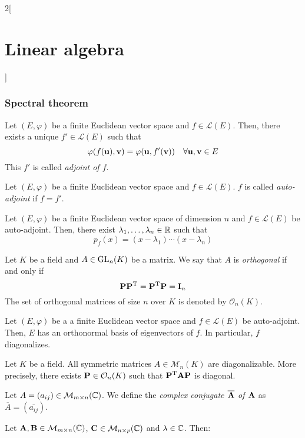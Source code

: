 \documentclass[../../../main.tex]{subfiles}
\begin{document}
\begin{multicols}{2}[\section{Linear algebra}]
\subsubsection*{Spectral theorem}
\begin{definition}
    Let $(E,\varphi)$ be a finite Euclidean vector space and $f\in\mathcal{L}(E)$. Then, there exists a unique $f'\in\mathcal{L}(E)$ such that $$\varphi(f(\vb{u}),\vb{v})=\varphi(\vb{u},f'(\vb{v}))\quad\forall \vb{u},\vb{v}\in E$$ This $f'$ is called \textit{adjoint of $f$}. 
\end{definition}
\begin{definition}
    Let $(E,\varphi)$ be a finite Euclidean vector space and $f\in\mathcal{L}(E)$. $f$ is called \textit{auto-adjoint} if $f=f'$.
\end{definition}
\begin{lemma}
    Let $(E,\varphi)$ be a finite Euclidean vector space of dimension $n$ and $f\in\mathcal{L}(E)$ be auto-adjoint. Then, there exist $\lambda_1,\ldots,\lambda_n\in\mathbb{R}$ such that $$p_f(x)=(x-\lambda_1 )\cdots(x-\lambda_n)$$
\end{lemma}
\begin{definition}
    Let $K$ be a field and $A\in\mathrm{GL}_n(K)$ be a matrix. We say that $A$ is \textit{orthogonal} if and only if $$\vb{P}\vb{P}^{\mathrm{T}}=\vb{P}^{\mathrm{T}}\vb{P}=\vb{I}_n$$ The set of orthogonal matrices of size $n$ over $K$ is denoted by $\mathcal{O}_n(K)$.
\end{definition}
\begin{theorem}
    Let $(E,\varphi)$ be a a finite Euclidean vector space and $f\in\mathcal{L}(E)$ be auto-adjoint. Then, $E$ has an orthonormal basis of eigenvectors of $f$. In particular, $f$ diagonalizes.
\end{theorem}
\begin{corollary}
    Let $K$ be a field. All symmetric matrices $A\in\mathcal{M}_n(K)$ are diagonalizable. More precisely, there exists $\vb{P}\in\mathcal{O}_n(K)$ such that $\vb{P}^{\mathrm{T}}\vb{A}\vb{P}$ is diagonal.
\end{corollary}
\begin{definition}
    Let $A=(a_{ij})\in\mathcal{M}_{m\times n}(\mathbb{C})$. We define the \textit{complex conjugate $\overline{\vb{A}}$ of $\vb{A}$} as $\overline{A}=(\overline{a_{ij}})$.
\end{definition}
\begin{prop}
    Let $\vb{A},\vb{B}\in\mathcal{M}_{m\times n}(\mathbb{C})$, $\vb{C}\in\mathcal{M}_{n\times p}(\mathbb{C})$ and $\lambda\in\mathbb{C}$. Then:

\end{prop}
\end{multicols}
\end{document}
